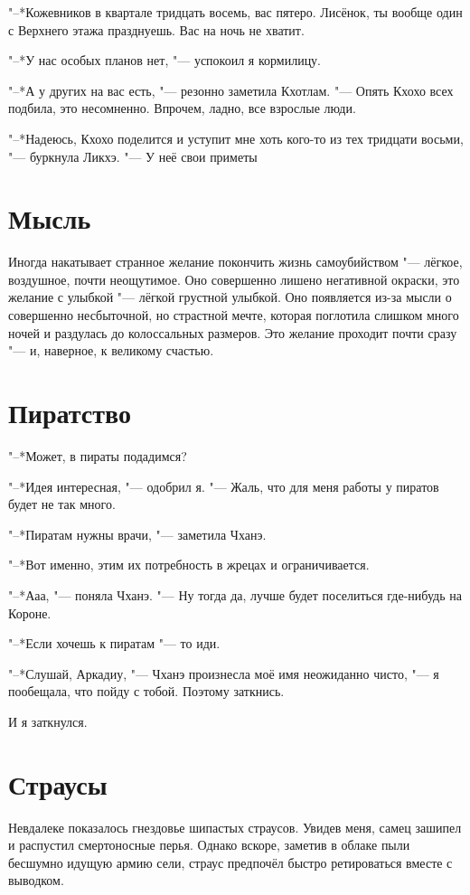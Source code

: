 \documentclass[a4paper,10pt]{book}
\newcommand{\ldotst}{\so{...}\xspace}
\begin{document}
"--*Кожевников в квартале тридцать восемь, вас пятеро. Лисёнок, ты вообще один с Верхнего этажа празднуешь. Вас на ночь не хватит.

"--*У нас особых планов нет, "--- успокоил я кормилицу.

"--*А у других на вас есть, "--- резонно заметила Кхотлам. "--- Опять Кхохо всех подбила, это несомненно. Впрочем, ладно, все взрослые люди.
 
"--*Надеюсь, Кхохо поделится и уступит мне хоть кого-то из тех тридцати восьми, "--- буркнула Ликхэ. "--- У неё свои приметы\ldotst
 
 \section{Мысль}

 Иногда накатывает странное желание покончить жизнь самоубийством "--- лёгкое, воздушное, почти неощутимое. Оно совершенно лишено негативной окраски, это желание с улыбкой "--- лёгкой грустной улыбкой. Оно появляется из-за мысли о совершенно несбыточной, но страстной мечте, которая поглотила слишком много ночей и раздулась до колоссальных размеров. Это желание проходит почти сразу "--- и, наверное, к великому счастью.
 
 \section{Пиратство}

 "--*Может, в пираты подадимся?

"--*Идея интересная, "--- одобрил я. "--- Жаль, что для меня работы у пиратов будет не так много.

"--*Пиратам нужны врачи, "--- заметила Чханэ.

"--*Вот именно, этим их потребность в жрецах и ограничивается.

"--*Ааа, "--- поняла Чханэ. "--- Ну тогда да, лучше будет поселиться где-нибудь на Короне.

"--*Если хочешь к пиратам "--- то иди.

"--*Слушай, Аркадиу, "--- Чханэ произнесла моё имя неожиданно чисто, "--- я пообещала, что пойду с тобой. Поэтому заткнись.

И я заткнулся.
 
 \section{Страусы}

 Невдалеке показалось гнездовье шипастых страусов. Увидев меня, самец зашипел и распустил смертоносные перья. Однако вскоре, заметив в облаке пыли бесшумно идущую армию сели, страус предпочёл быстро ретироваться вместе с выводком.
 
\end{document}

